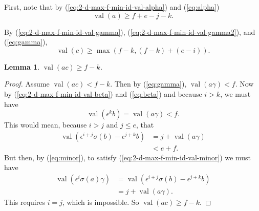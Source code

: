 \documentclass{amsart}
\newtheorem{lemma}{Lemma}[subsection]
\theoremstyle{definition}
\def\e{\epsilon}
\def\val{\mathop{\mathrm{val}}}
\def\s{\sigma}
\begin{document}
  First, note that by (\ref{eq:2-d-max-f-min-id-val-alpha}) and
  (\ref{eq:alpha})
  \begin{equation}
    \label{eq:2-d-max-f-min-id-val-a}
    \val(a) \ge f + e -  j - k.
  \end{equation}

  By (\ref{eq:2-d-max-f-min-id-val-gamma}),
  (\ref{eq:2-d-max-f-min-id-val-gamma2}), and (\ref{eq:gamma}),
  \begin{equation}
    \label{eq:2-d-max-f-min-id-val-c}
    \val(c) \ge \max(f-k, (f-k) + (e -i)).
  \end{equation}

  \begin{lemma}
    \label{lemma:2-d-max-f-min-id-val-ac}
    $\val(ac) \ge f - k$.
  \end{lemma}
  \begin{proof}
    Assume $\val(ac) < f - k$.  Then by (\ref{eq:gamma}), $\val(a\gamma) < f$.
    Now by (\ref{eq:2-d-max-f-min-id-val-beta}) and (\ref{eq:beta}) and because
    $i > k$, we must have
    \begin{equation*}
      \val(\e^k b) = \val(a\gamma) < f.
    \end{equation*}
    This would mean, because $i > j$ and $j \le e$, that
    \begin{align*}
      \val(\e^{i+j}\s(b) - \e^{j+k}b) &= j + \val(a\gamma) \\
      &< e + f.
    \end{align*}
    But then, by (\ref{eq:minor}), to satisfy
    (\ref{eq:2-d-max-f-min-id-val-minor}) we must have
    \begin{align*}
      \val(\e^i\s(a)\gamma) &= \val(\e^{i+j}\s(b) - \e^{j+k}b) \\
      & = j + \val(a\gamma).
    \end{align*}
    This requires $i = j$, which is impossible.  So $\val(ac) \ge f-k$.
  \end{proof}
\end{document}
